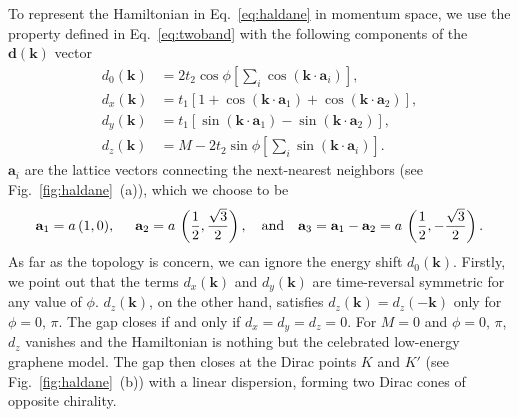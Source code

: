 To represent the Hamiltonian in Eq.~\eqref{eq:haldane} in momentum space, we use the property defined in Eq.~\eqref{eq:twoband} with the following components of the $\mathbf{d} ( \mathbf{k})$ vector
\begin{equation}
\begin{aligned}
d_0 (\mathbf{k} ) & = 2 t_2 \cos \phi \left[\sum_i \cos (\mathbf{k} \cdot \mathbf{a}_i) \right], \\ 
d_x (\mathbf{k} ) &= t_1 \left[ 1 + \cos ( \mathbf{k} \cdot  \mathbf{a}_1 ) + \cos ( \mathbf{k} \cdot  \mathbf{a}_2 ) \right], \\
d_y (\mathbf{k} ) & = t_1 \left[ \sin (\mathbf{k}  \cdot \mathbf{a}_1 ) -  \sin (\mathbf{k}  \cdot \mathbf{a}_2 ) \right], \\
d_z (\mathbf{k} ) & = M - 2t_2 \sin \phi \left[ \sum_i \sin (\mathbf{k}  \cdot \mathbf{a}_i) \right].
\end{aligned}
\end{equation}
$\mathbf{a}_i$ are the lattice vectors connecting the next-nearest neighbors (see Fig.~\ref{fig:haldane}~(a)), which we choose to be 
\begin{equation}
\mathbf{a}_1  = a \, (1, 0), \hspace*{0.5cm} \mathbf{a}_2  = a \, \left( \frac{1}{2}, \frac{\sqrt{3}}{2} \right),  \hspace*{0.35cm} \mathrm{and} \hspace*{0.35cm} \mathbf{a}_3  = \mathbf{a}_1 - \mathbf{a}_2 = a \, \left( \frac{1}{2}, - \frac{\sqrt{3}}{2} \right).
\end{equation}
As far as the topology is concern, we can ignore the energy shift $d_0 (\mathbf{k} )$. Firstly, we point out that the terms $d_x (\mathbf{k} )$ and $d_y (\mathbf{k} )$ are time-reversal symmetric for any value of $\phi$. $d_z (\mathbf{k} )$, on the other hand, satisfies $d_z (\mathbf{k} ) = d_z (-\mathbf{k} )$ only for $ \phi = 0, \, \pi$. The gap closes if and only if $d_x = d_y = d_z = 0$. For $M=0$ and $\phi=0, \, \pi$, $d_z$ vanishes and the Hamiltonian is nothing but the celebrated low-energy graphene model. The gap then closes at the Dirac points $K$ and $K'$ (see Fig.~\ref{fig:haldane}~(b)) with a linear dispersion, forming two Dirac cones of opposite chirality. 

